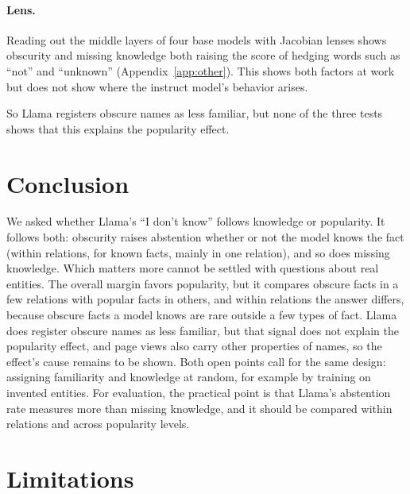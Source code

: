 \documentclass[letterpaper]{article} %
\newcommand{\idk}{``I don't know''}
\begin{document}
\paragraph{Lens.}
Reading out the middle layers of four base models with Jacobian lenses \citep{gurnee2026verbalizable} shows obscurity and missing knowledge both raising the score of hedging words such as ``not'' and ``unknown'' (Appendix~\ref{app:other}). This shows both factors at work but does not show where the instruct model's behavior arises.

So Llama registers obscure names as less familiar, but none of the three tests shows that this explains the popularity effect.

\section{Conclusion}

We asked whether Llama's \idk{} follows knowledge or popularity. It follows both: obscurity raises abstention whether or not the model knows the fact (within relations, for known facts, mainly in one relation), and so does missing knowledge. Which matters more cannot be settled with questions about real entities. The overall margin favors popularity, but it compares obscure facts in a few relations with popular facts in others, and within relations the answer differs, because obscure facts a model knows are rare outside a few types of fact. Llama does register obscure names as less familiar, but that signal does not explain the popularity effect, and page views also carry other properties of names, so the effect's cause remains to be shown. Both open points call for the same design: assigning familiarity and knowledge at random, for example by training on invented entities. For evaluation, the practical point is that Llama's abstention rate measures more than missing knowledge, and it should be compared within relations and across popularity levels.

\section*{Limitations}
\end{document}
